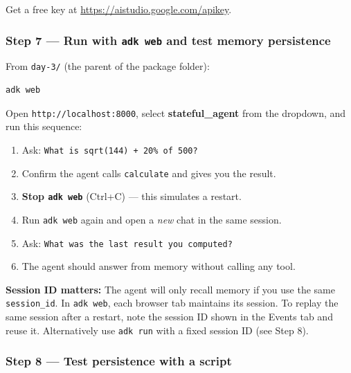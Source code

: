 \documentclass[12pt, a4paper]{article}
\begin{document}
\begin{practicalbox}
Get a free key at \url{https://aistudio.google.com/apikey}.

\subsubsection*{Step 7 --- Run with \texttt{adk web} and test memory persistence}


From \texttt{day-3/} (the parent of the package folder):

\begin{lstlisting}[style=bashstyle]
adk web
\end{lstlisting}

Open \texttt{http://localhost:8000}, select \textbf{stateful\_agent} from the
dropdown, and run this sequence:

\begin{enumerate}[leftmargin=*, itemsep=2pt]
  \item Ask: \texttt{What is sqrt(144) + 20\% of 500?}
  \item Confirm the agent calls \texttt{calculate} and gives you the result.
  \item \textbf{Stop \texttt{adk web}} (Ctrl+C) --- this simulates a restart.
  \item Run \texttt{adk web} again and open a \emph{new} chat in the same session.
  \item Ask: \texttt{What was the last result you computed?}
  \item The agent should answer from memory without calling any tool.
\end{enumerate}

\begin{notebox}
\textbf{Session ID matters:} The agent will only recall memory if you use the
same \texttt{session\_id}. In \texttt{adk web}, each browser tab maintains its
session. To replay the same session after a restart, note the session ID shown
in the Events tab and reuse it. Alternatively use \texttt{adk run} with a
fixed session ID (see Step 8).
\end{notebox}

\subsubsection*{Step 8 --- Test persistence with a script}


\end{practicalbox}
\end{document}
